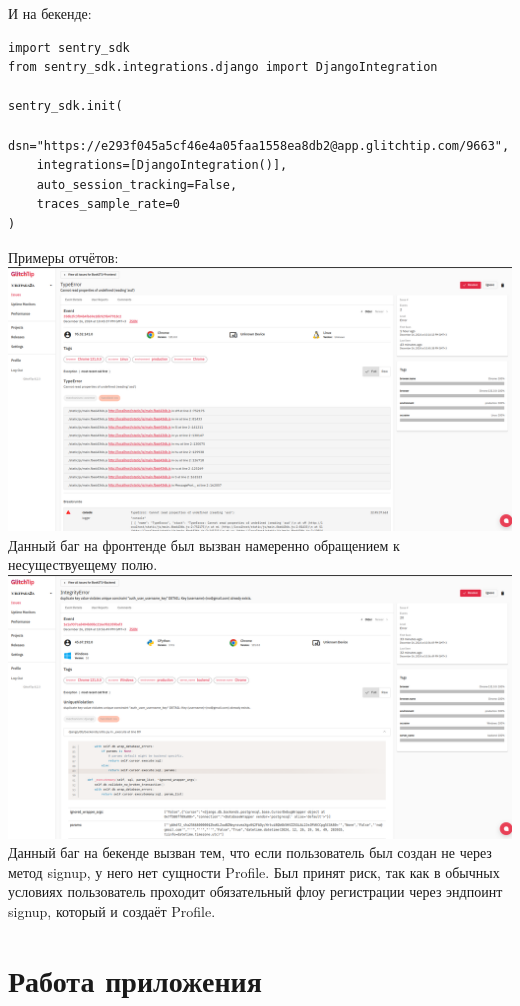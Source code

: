 \documentclass[a4paper,14pt]{extarticle}
\begin{document}
И на бекенде:
\begin{verbatim}
import sentry_sdk
from sentry_sdk.integrations.django import DjangoIntegration
 
sentry_sdk.init(
    dsn="https://e293f045a5cf46e4a05faa1558ea8db2@app.glitchtip.com/9663",
    integrations=[DjangoIntegration()],
    auto_session_tracking=False,
    traces_sample_rate=0
)
\end{verbatim}

Примеры отчётов:\\
\includegraphics[width=140mm]{error_front.png}\\
Данный баг на фронтенде был вызван намеренно обращением к несуществуещему полю.\\
\includegraphics[width=140mm]{error_back.png}\\
Данный баг на бекенде вызван тем, что если пользователь был создан не через 
метод signup, у него нет сущности Profile. Был принят риск, так как в обычных условиях
пользователь проходит обязательный флоу регистрации через эндпоинт signup, который
и создаёт Profile.\\

\section{Работа приложения}
\end{document}
